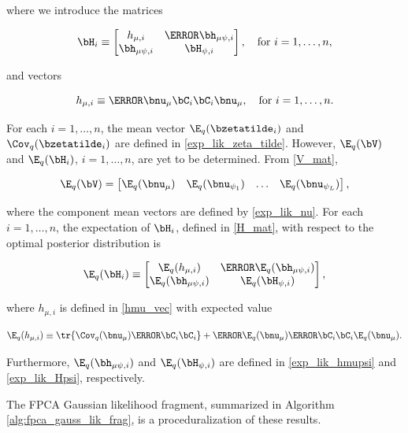 \documentclass[12pt]{article}
\def\numu{\bnu_\mu}
\newcommand\nupsi[1]{\bnu_{\psi_{#1}}}
\newcommand\hmu[1]{h_{\mu, i}}
\newcommand\hmupsi[1]{\bh_{\mu \psi, i}}
\newcommand\Hpsi[1]{\bH_{\psi, i}}
\theoremstyle{plain}
\theoremstyle{definition}
\theoremstyle{remark}
\begin{document}
\noindent where we introduce the matrices

\begin{equation}
	\bH_i \equiv \begin{bmatrix}
		\hmu{i} & \T{\hmupsi{i}} \\
		\hmupsi{i} & \Hpsi{i}
	\end{bmatrix}, \quad
	\text{for $i = 1, \dots, n$},
\label{H_mat}
\end{equation}

\noindent and vectors

\begin{equation}
	\hmu{i} \equiv \T{\numu} \bC_i \bC_i \numu, \quad
	\text{for $i = 1, \dots, n$}.
\label{hmu_vec}
\end{equation}

\noindent For each $i = 1, \dots, n$, the mean vector $\E_q (\bzetatilde_i)$ and $\Cov_q (\bzetatilde_i)$ are defined in
\eqref{exp_lik_zeta_tilde}. However, $\E_q (\bV)$ and $\E_q (\bH_i)$, $i = 1, \dots, n$, are yet to be determined.
From \eqref{V_mat},

\[
	\E_q (\bV) = \begin{bmatrix}
		\E_q (\numu) & \E_q (\nupsi{1}) & \dots & \E_q (\nupsi{L})
	\end{bmatrix},
\]

\noindent where the component mean vectors are defined by \eqref{exp_lik_nu}.
For each $i = 1, \dots, n$, the expectation of $\bH_i$, defined in \eqref{H_mat},
with respect to the optimal posterior distribution is

\[
	\E_q (\bH_i) \equiv \begin{bmatrix}
		\E_q (\hmu{i}) & \T{\E_q (\hmupsi{i})} \\
		\E_q (\hmupsi{i}) & \E_q (\Hpsi{i})
	\end{bmatrix},
\]

\noindent where $\hmu{i}$ is defined in \eqref{hmu_vec} with expected value

\[
	\E_q (\hmu{i}) \equiv
		\tr \{ \Cov_q (\numu) \T{\bC_i} \bC_i \}
		+ \T{\E_q (\numu)} \T{\bC_i} \bC_i \E_q (\numu).
\]

\noindent Furthermore, $\E_q (\hmupsi{i})$ and $\E_q (\Hpsi{i})$ are defined in \eqref{exp_lik_hmupsi} and
\eqref{exp_lik_Hpsi}, respectively.

The FPCA Gaussian likelihood fragment, summarized in Algorithm \ref{alg:fpca_gauss_lik_frag}, is a
proceduralization of these results.

\end{document}
